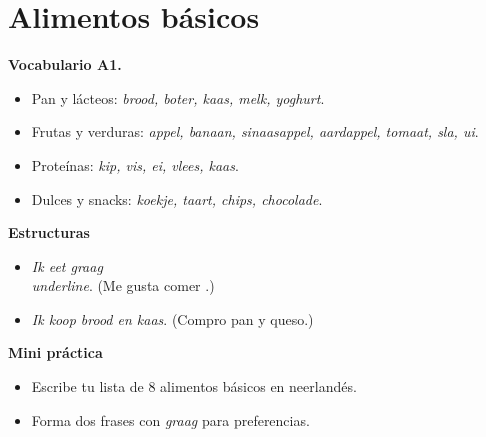 \section{Alimentos básicos}
\textbf{Vocabulario A1.}
\begin{itemize}[leftmargin=*]
  \item Pan y lácteos: \textit{brood, boter, kaas, melk, yoghurt}.
  \item Frutas y verduras: \textit{appel, banaan, sinaasappel, aardappel, tomaat, sla, ui}.
  \item Proteínas: \textit{kip, vis, ei, vlees, kaas}.
  \item Dulces y snacks: \textit{koekje, taart, chips, chocolade}.
\end{itemize}

\textbf{Estructuras}
\begin{itemize}[leftmargin=*]
  \item \textit{Ik eet graag \\underline{\hspace{1.2cm}}}. (Me gusta comer \underline{\hspace{1.2cm}}.)
  \item \textit{Ik koop brood en kaas}. (Compro pan y queso.)
\end{itemize}

\textbf{Mini práctica}
\begin{itemize}[leftmargin=*]
  \item Escribe tu lista de 8 alimentos básicos en neerlandés.
  \item Forma dos frases con \textit{graag} para preferencias.
\end{itemize}
